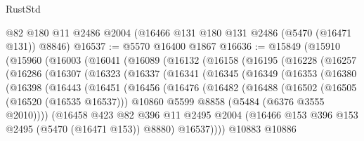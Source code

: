 \begin{lexlean}{RustStd}
\begin{coremodule}
{\begin{coremodule}
{{{{{{{{{{{{{{{{{{{{{{{{{{{{{{{    @82
    @180
    @11
    @2486
    @2004
    (@16466 @131 @180 @131 @2486 (@5470 (@16471 @131)) @8846)
@16537 := @5570 @16400 @1867
@16636 := @15849
    (@15910
      (@15960
        (@16003
          (@16041
            (@16089
              (@16132
                (@16158
                  (@16195
                    (@16228
                      (@16257
                        (@16286
                          (@16307
                            (@16323
                              (@16337
                                (@16341
                                  (@16345
                                    (@16349
                                      (@16353
                                        (@16380
                                          (@16398
                                            (@16443
                                              (@16451
                                                (@16456
                                                  (@16476
                                                    (@16482
                                                      (@16488
                                                        (@16502
                                                          (@16505 (@16520 (@16535 @16537)))
                                                          @10860
                                                          @5599
                                                          @8858
                                                          (@5484 (@6376 @3555 @2010))))
                                                      (@16458
                                                        @423
                                                        @82
                                                        @396
                                                        @11
                                                        @2495
                                                        @2004
                                                        (@16466
                                                          @153
                                                          @396
                                                          @153
                                                          @2495
                                                          (@5470 (@16471 @153))
                                                          @8880)
                                                        @16537))))
                                                @10883
                                                @10886
}}}}}}}}}}}}}}}}}}}}}}}}}}}}}}}
\end{coremodule}}
\end{coremodule}
\end{lexlean}
